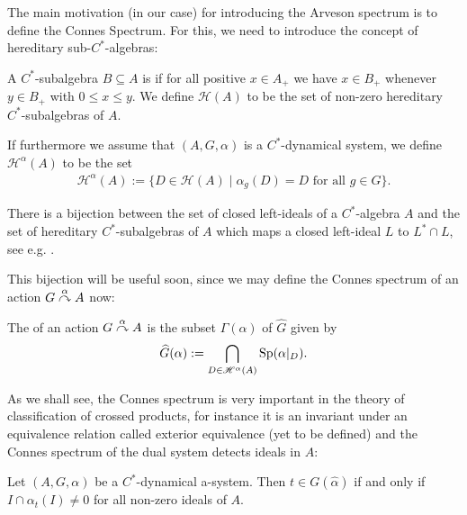 The main motivation (in our case) for introducing the Arveson spectrum is to define the Connes Spectrum. For this, we need to introduce the concept of hereditary sub-$C^*$-algebras:
\begin{definition}
	A $C^*$-subalgebra $B\subseteq A$ is  if for all positive $x \in A_+$ we have $x \in B_+$ whenever $y \in B_+$ with $0 \leq x \leq y$. We define $\mathscr{H}(A)$ to be the set of non-zero hereditary $C^*$-subalgebras of $A$. 
	
	If furthermore we assume that $(A, G, \alpha)$ is a $C^*$-dynamical system, we define $\mathscr{H}^\alpha(A)$ to be the set
	\begin{align*}
		\mathscr{H}^\alpha (A) := \{ D \in \mathscr{H}(A) \mid \alpha_g(D)=D \text{ for all } g \in G\}.
	\end{align*}
\end{definition}
\begin{remark}
	There is a bijection between the set of closed left-ideals of a $C^*$-algebra $A$ and the set of hereditary $C^*$-subalgebras of $A$ which maps a closed left-ideal $L$ to $L^* \cap L$, see e.g. \cite[II.5.3.2]{blackadar}.
\end{remark}
This bijection will be useful soon, since we may define the Connes spectrum of an action $G \stackrel{\alpha}{\curvearrowright} A$ now:
\begin{definition}
	The  of an action $G \stackrel{\alpha}{\curvearrowright} A$ is the subset $\Gamma(\alpha)$ of $\hat G$ given by
	\begin{align*}
		\widehat{G} ( \alpha) := \bigcap_{D \in \mathscr{H}^\alpha (A)} \mathrm{Sp}(\alpha|_D).
	\end{align*}
\end{definition}
As we shall see, the Connes spectrum is very important in the theory of classification of crossed products, for instance it is an invariant under an equivalence relation called exterior equivalence (yet to be defined) and the Connes spectrum of the dual system detects ideals in $A$:
\begin{proposition}
	Let $(A, G, \alpha)$ be a $C^*$-dynamical a-system. Then $t \in G(\hat \alpha)$ if and only if $I \cap \alpha_t(I) \neq 0$ for all non-zero ideals of $A$.
	\label{connesideal1}
\end{proposition}
